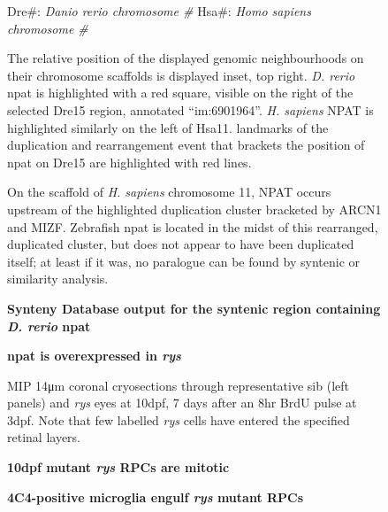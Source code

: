 \begin{sidewaysfigure}[!h]
    \caption{{\bf Synteny Database output for the syntenic region containing \textit{D. rerio} npat}}
    Dre\#: \textit{Danio rerio chromosome \#}
    Hsa\#: \textit{Homo sapiens chromosome \#}

    The relative position of the displayed genomic neighbourhoods on their chromosome scaffolds is displayed inset, top right. \textit{D. rerio} npat is highlighted with a red square, visible on the right of the selected Dre15 region, annotated ``im:6901964''. \textit{H. sapiens} NPAT is highlighted similarly on the left of Hsa11. landmarks of the duplication and rearrangement event that brackets the position of npat on Dre15 are highlighted with red lines.

    On the scaffold of \textit{H. sapiens} chromosome 11, NPAT occurs upstream of the highlighted duplication cluster bracketed by ARCN1 and MIZF. Zebrafish npat is located in the midst of this rearranged, duplicated cluster, but does not appear to have been duplicated itself; at least if it was, no paralogue can be found by syntenic or similarity analysis.
    \label{synteny}
\end{sidewaysfigure}


\begin{figure}[!h]
    \caption{{\bf npat is overexpressed in \textit{rys}}} 
    \label{npatrtpcr}
\end{figure}

\begin{figure}[!h]
    \caption{{\bf 10dpf mutant \textit{rys} RPCs are mitotic}} MIP 14\si{\micro\metre} coronal cryosections through representative sib (left panels) and \textit{rys} eyes at 10dpf, 7 days after an 8hr BrdU pulse at 3dpf. Note that few labelled \textit{rys} cells have entered the specified retinal layers.
    \label{rysmitosis}
\end{figure}

\begin{figure}[!h]
    \caption{{\bf 4C4-positive microglia engulf \textit{rys} mutant RPCs}} 
    \label{phagocytosis}
\end{figure}


